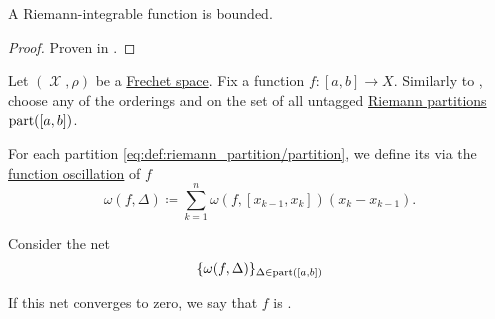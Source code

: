 \begin{corollary}\label{thm:riemann_integrable_implies_bounded}
  A Riemann-integrable function is bounded.
\end{corollary}
\begin{proof}
  Proven in .
\end{proof}

\begin{definition}\label{def:darboux_integrability}
  Let \( (\mscrX, \rho) \) be a \hyperref[def:frechet_space]{Frechet space}. Fix a function \( f: [a, b] \to X \). Similarly to , choose any of the orderings  and  on the set of all untagged \hyperref[def:riemann_partition/partition]{Riemann partitions} \( \operatorname{part}([a, b]) \).

  For each partition \eqref{eq:def:riemann_partition/partition}, we define its  via the \hyperref[def:function_oscillation]{function oscillation} of \( f \)
  \begin{equation}\label{eq:def:darboux_integrability/oscillation}
    \omega(f, \Delta) \coloneqq \sum_{k=1}^n \omega(f, [x_{k-1}, x_k]) (x_k - x_{k-1}).
  \end{equation}

  Consider the net
  \begin{equation}\label{eq:def:darboux_integrability/net}
    \{ \omega(f, \Delta) \}_{\Delta \in \operatorname{part}([a, b])}
  \end{equation}

  If this net converges to zero, we say that \( f \) is .
\end{definition}

